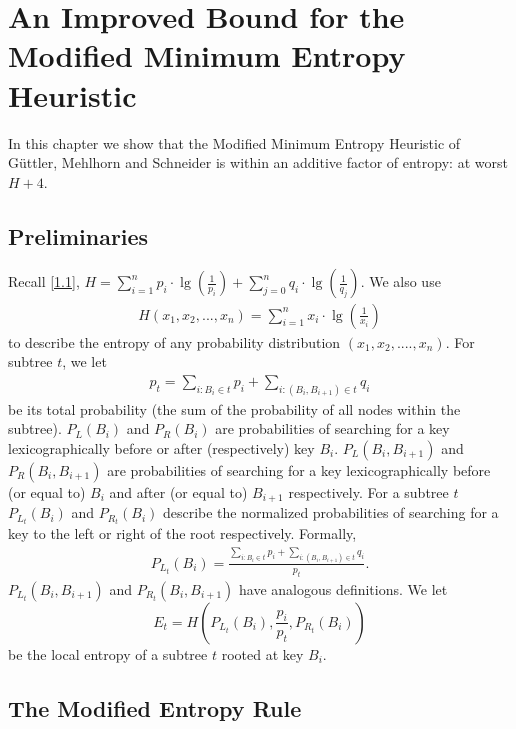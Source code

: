 \documentclass[letterpaper,12pt,titlepage,oneside,final]{book}
\theoremstyle{plain}
\begin{document}
\chapter{An Improved Bound for the Modified Minimum Entropy Heuristic}\label{An Improved Bound for the Modified Minimum Entropy Heuristic}

In this chapter we show that the Modified Minimum Entropy Heuristic of G{\"u}ttler, Mehlhorn and Schneider \cite{guttler1980binary} is within an additive factor of entropy: at worst $H+4$.

\section{Preliminaries}

Recall \ref{1.1}, $H = \sum_{i=1}^{n} p_i\cdot\lg(\frac{1}{p_i}) + \sum_{j=0}^{n} q_i\cdot\lg(\frac{1}{q_j})$. We also use
\begin{align*}
H(x_1,x_2,...,x_n) = \sum_{i=1}^{n} x_i\cdot\lg(\frac{1}{x_i})
\end{align*} to describe the entropy of any probability distribution $(x_1, x_2, ...., x_n)$. For subtree $t$, we let 
\begin{align*}
p_t=\sum_{i : B_i \in t} p_i + \sum_{i : (B_i, B_{i+1}) \in t} q_i
\end{align*}
 be its total probability (the sum of the probability of all nodes within the subtree). $P_{L}(B_i)$ and $P_{R}(B_i)$ are probabilities of searching for a key lexicographically before or after (respectively) key $B_i$. $P_{L}(B_i, B_{i+1})$ and $P_{R}(B_i, B_{i+1})$ are probabilities of searching for a key lexicographically before (or equal to) $B_i$ and after (or equal to) $B_{i+1}$ respectively. For a subtree  $t$ $P_{L_t}(B_i)$ and $P_{R_t}(B_i)$ describe the normalized probabilities of searching for a key to the left or right of the root respectively. Formally,
\begin{align*}
P_{L_t}(B_i) = \frac{\sum_{i : B_i \in t} p_i + \sum_{i : (B_i, B_{i+1}) \in t} q_i}{p_t}.
\end{align*}
$P_{L_t}(B_i,B_{i+1})$ and $P_{R_t}(B_i,B_{i+1})$ have analogous definitions. 
We let  
\begin{equation}
E_t=H(P_{L_t}(B_i), \frac{p_i}{p_t}, P_{R_t}(B_i))
\end{equation} be the local entropy of a subtree $t$ rooted at key $B_i$.  

\section{The Modified Entropy Rule}\label{The Modified Entropy Rule}
\end{document}
